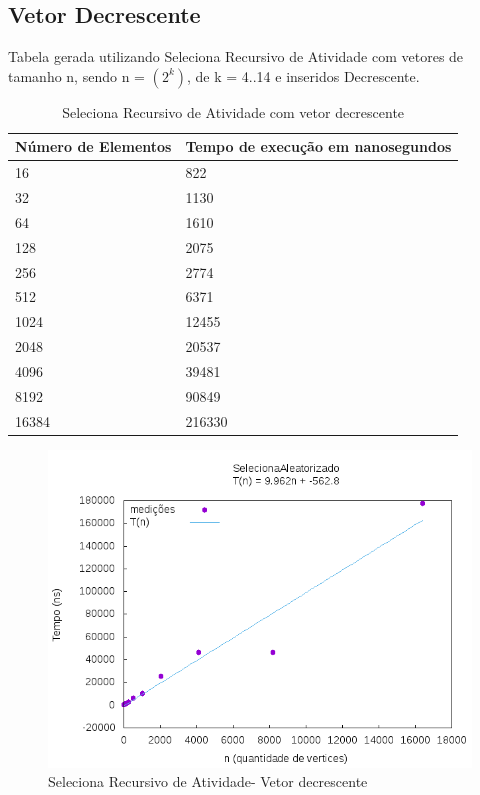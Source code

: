 \documentclass[12pt,a4paper,twoside]{report}
\begin{document}
\subsection{Vetor Decrescente}
Tabela gerada utilizando Seleciona Recursivo de Atividade com vetores de tamanho n, sendo n = $(2^k)$, de k = 4..14 e inseridos Decrescente.
\begin{table}[H]
\centering
\caption{Seleciona Recursivo de Atividade com vetor decrescente}
\label{my-label}
\begin{tabular}{|l|l|}
\hline
\multicolumn{1}{|c|}{\textbf{Número de Elementos}} & \multicolumn{1}{c|}{\textbf{Tempo de execução em nanosegundos}} \\ \hline
16 & 822 \\ \hline
32 & 1130 \\ \hline
64 & 1610 \\ \hline
128 & 2075 \\ \hline
256 & 2774 \\ \hline
512 & 6371 \\ \hline
1024 & 12455 \\ \hline
2048 & 20537 \\ \hline
4096 & 39481 \\ \hline
8192 & 90849 \\ \hline
16384 & 216330 \\ \hline

\end{tabular}
\end{table}

\begin{figure}[H]
    \centering
    \includegraphics[width=0.7\linewidth]{graficos/SeletorRecursivoAtividades/Decrescente/SelecionaAleatorizado.png}
  \caption{Seleciona Recursivo de Atividade- Vetor decrescente}
\end{figure}
\end{document}
